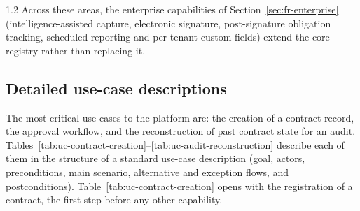 \begin{spacing}{1.2}
Across these areas, the enterprise capabilities of
Section~\ref{sec:fr-enterprise} (intelligence-assisted capture,
electronic signature, post-signature obligation tracking, scheduled
reporting and per-tenant custom fields) extend the core registry rather
than replacing it.

\subsection{Detailed use-case descriptions}
\label{sec:uc-descriptions}

The most critical use cases to the
platform are: the creation of a contract record, the approval workflow, and
the reconstruction of past contract state for an audit.
Tables~\ref{tab:uc-contract-creation}--\ref{tab:uc-audit-reconstruction}
describe each of them in the structure of a standard use-case
description (goal, actors, preconditions, main scenario, alternative
and exception flows, and postconditions).
Table~\ref{tab:uc-contract-creation} opens with the registration of a
contract, the first step before any other capability.


\end{spacing}
